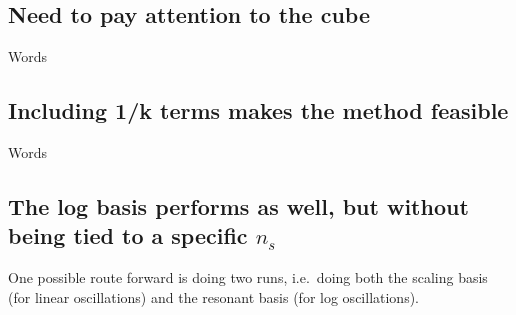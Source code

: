     \subsection{Need to pay attention to the cube}
    Words
    \subsection{Including 1/k terms makes the method feasible}
    Words
    \subsection{The log basis performs as well, but without being tied to a specific $n_s$}
    One possible route forward is doing two runs, i.e.\ doing both the scaling basis (for linear oscillations) and the resonant basis (for log oscillations).
